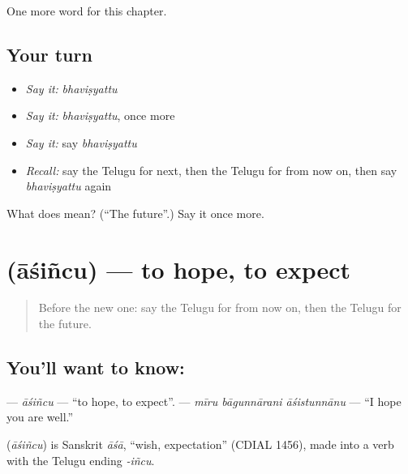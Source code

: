 \begin{grammarlens}[title={What you've built}]
One more word for this chapter.
\end{grammarlens}

\subsection*{Your turn}
\begin{itemize}
\raggedright
  \item \emph{Say it:} \emph{bhaviṣyattu}
  \item \emph{Say it:} \emph{bhaviṣyattu}, once more
  \item \emph{Say it:} say \emph{bhaviṣyattu}
  \item \emph{Recall:} say the Telugu for next, then the Telugu for from now on, then say \emph{bhaviṣyattu} again
\end{itemize}

\begin{tcolorbox}[breakable,colback=teal!4,colframe=teal!35!black,title={Before you move on}]
What does  mean? (\textquotedblleft{}The future\textquotedblright{}.) Say it once more.
\end{tcolorbox}
\section[\texorpdfstring{\te{ఆశించు} (āśiñcu)}{ఆశించు (āśiñcu)}]{ (āśiñcu) — to hope, to expect}

\label{lesson:TE-C155-ashincu}



\begin{quote}
Before the new one: say the Telugu for from now on, then the Telugu for the future.
\end{quote}

\subsection*{You'll want to know: }
\textbf{} — \emph{āśiñcu} — \textquotedblleft{}to hope, to expect\textquotedblright{}. \textbf{  } — \emph{mīru bāgunnārani āśistunnānu} — \textquotedblleft{}I hope you are well.\textquotedblright{}

\begin{cousinweb}
\textbf{} (\emph{āśiñcu}) is Sanskrit \emph{āśā}, \textquotedblleft{}wish, expectation\textquotedblright{} (CDIAL 1456), made into a verb with the Telugu ending \emph{-iñcu}.
\end{cousinweb}


